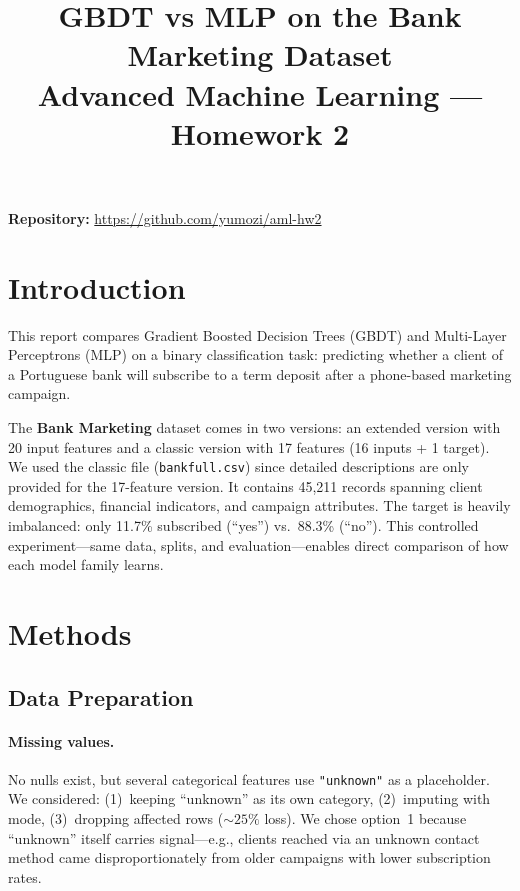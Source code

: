 \documentclass[11pt, a4paper]{article}
\title{\textbf{GBDT vs MLP on the Bank Marketing Dataset}\\[0.3em]
\large Advanced Machine Learning --- Homework 2}
\author{}
\date{}
\begin{document}
\maketitle
\noindent\textbf{Repository:} \url{https://github.com/yumozi/aml-hw2}

\section{Introduction}

This report compares Gradient Boosted Decision Trees (GBDT) and Multi-Layer
Perceptrons (MLP) on a binary classification task: predicting whether a client
of a Portuguese bank will subscribe to a term deposit after a phone-based
marketing campaign.

The \textbf{Bank Marketing} dataset comes in two versions: an extended version
with 20 input features and a classic version with 17 features (16 inputs + 1
target). We used the classic file (\texttt{bank\text{-}full.csv}) since
detailed descriptions are only provided for the 17-feature version. It contains
45,211 records spanning client demographics, financial indicators, and campaign
attributes. The target is heavily imbalanced: only 11.7\% subscribed (``yes'')
vs.\ 88.3\% (``no''). This controlled experiment---same data, splits, and
evaluation---enables direct comparison of how each model family learns.

\section{Methods}

\subsection{Data Preparation}

\paragraph{Missing values.}
No nulls exist, but several categorical features use \texttt{"unknown"} as a
placeholder. We considered: (1)~keeping ``unknown'' as its own category,
(2)~imputing with mode, (3)~dropping affected rows (${\sim}25\%$ loss). We
chose option~1 because ``unknown'' itself carries signal---e.g., clients
reached via an unknown contact method came disproportionately from older
campaigns with lower subscription rates.
\end{document}
